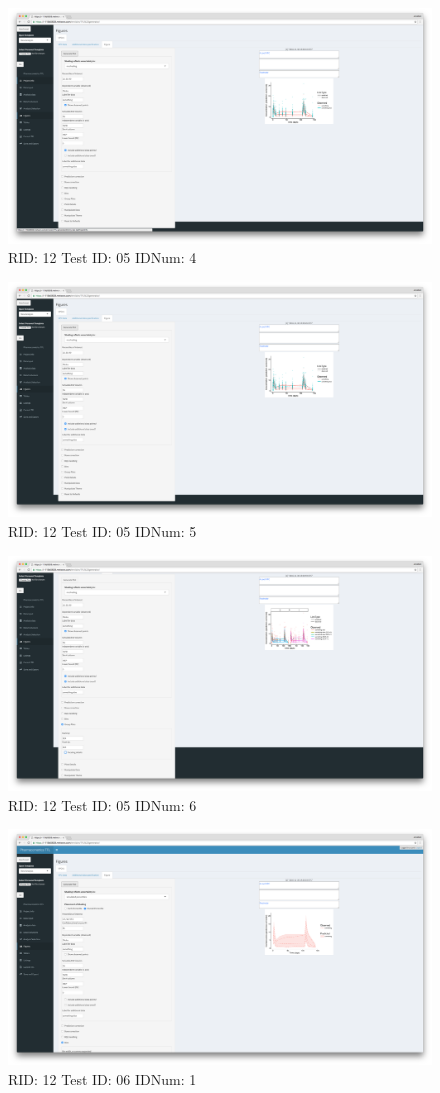 \begin{figure}[H]
\includegraphics[width=.8\textwidth]{screencaps/12-05-4.png}
\caption{RID: 12 Test ID: 05 IDNum: 4}
\end{figure}
\begin{figure}[H]
\includegraphics[width=.8\textwidth]{screencaps/12-05-5.png}
\caption{RID: 12 Test ID: 05 IDNum: 5}
\end{figure}
\begin{figure}[H]
\includegraphics[width=.8\textwidth]{screencaps/12-05-6.png}
\caption{RID: 12 Test ID: 05 IDNum: 6}
\end{figure}
\begin{figure}[H]
\includegraphics[width=.8\textwidth]{screencaps/12-06-1.png}
\caption{RID: 12 Test ID: 06 IDNum: 1}
\end{figure}
